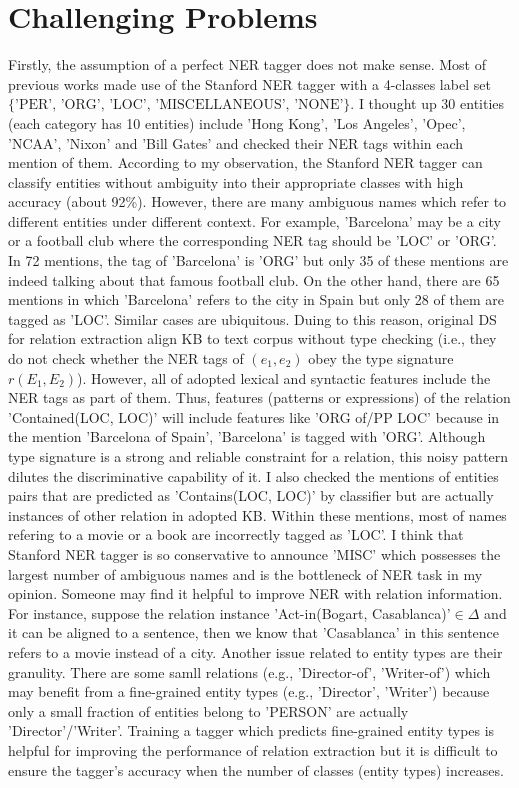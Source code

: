 \documentclass[10pt]{article} %
\theoremstyle{definition}
\theoremstyle{definition}
\begin{document}
\section{Challenging Problems}
Firstly, the assumption of a perfect NER tagger does not make sense. 
Most of previous works made use of the Stanford NER tagger with a 4-classes label set $\{\text{'PER', 'ORG', 'LOC', 'MISCELLANEOUS', 'NONE'}\}$. 
I thought up 30 entities (each category has 10 entities) include 'Hong Kong', 'Los Angeles', 'Opec', 'NCAA', 'Nixon' and 'Bill Gates' and checked their NER tags within each mention of them. 
According to my observation, the Stanford NER tagger can classify entities without ambiguity into their appropriate classes with high accuracy (about 92\%). 
However, there are many ambiguous names which refer to different entities under different context. 
For example, 'Barcelona' may be a city or a football club where the corresponding NER tag should be 'LOC' or 'ORG'. 
In 72 mentions, the tag of 'Barcelona' is 'ORG' but only 35 of these mentions are indeed talking about that famous football club. 
On the other hand, there are 65 mentions in which 'Barcelona' refers to the city in Spain but only 28 of them are tagged as 'LOC'. 
Similar cases are ubiquitous. 
Duing to this reason, original DS for relation extraction align KB to text corpus without type checking 
(i.e., they do not check whether the NER tags of $(e_1,e_2)$ obey the type signature $r(E_1,E_2)$). 
However, all of adopted lexical and syntactic features include the NER tags as part of them. 
Thus, features (patterns or expressions) of the relation 'Contained(LOC, LOC)' will include features like 'ORG of/PP LOC' 
because in the mention 'Barcelona of Spain', 'Barcelona' is tagged with 'ORG'. 
Although type signature is a strong and reliable constraint for a relation, this noisy pattern dilutes the discriminative capability of it. 
I also checked the mentions of entities pairs that are predicted as 'Contains(LOC, LOC)' by classifier but are actually instances of other relation in adopted KB. 
Within these mentions, most of names refering to a movie or a book are incorrectly tagged as 'LOC'. 
I think that Stanford NER tagger is so conservative to announce 'MISC' which possesses the largest number of ambiguous names and is the bottleneck of NER task in my opinion. 
Someone may find it helpful to improve NER with relation information. 
For instance, suppose the relation instance 'Act-in(Bogart, Casablanca)'$\in\Delta$ and it can be aligned to a sentence, then we know that 'Casablanca' in this sentence refers to a movie instead of a city. 
Another issue related to entity types are their granulity. 
There are some samll relations (e.g., 'Director-of', 'Writer-of') which may benefit from a fine-grained entity types (e.g., 'Director', 'Writer') because only a small fraction of entities belong to 'PERSON' are actually 'Director'/'Writer'. 
Training a tagger which predicts fine-grained entity types is helpful for improving the performance of relation extraction but it is difficult to ensure the tagger's accuracy when the number of classes (entity types) increases. 
\end{document}
